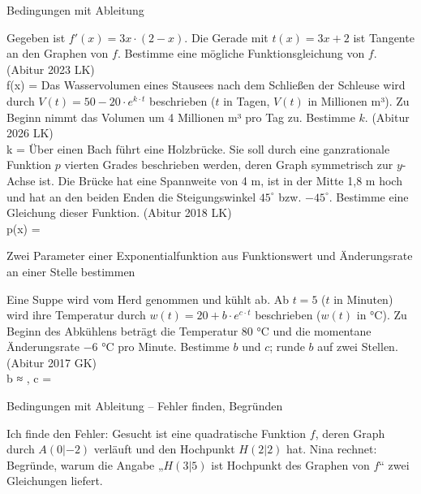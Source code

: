 \begin{aufgabe}{Bedingungen mit Ableitung}
\begin{teile}
\teil Gegeben ist $f'(x) = 3x \cdot (2 - x)$. Die Gerade mit $t(x) = 3x + 2$ ist Tangente an den Graphen von $f$. Bestimme eine mögliche Funktionsgleichung von $f$. \hfill (Abitur 2023 LK) \\ f(x) = \leerfeld
\teil Das Wasservolumen eines Stausees nach dem Schließen der Schleuse wird durch $V(t) = 50 - 20 \cdot e^{k \cdot t}$ beschrieben ($t$ in Tagen, $V(t)$ in Millionen m³). Zu Beginn nimmt das Volumen um 4 Millionen m³ pro Tag zu. Bestimme $k$. \hfill (Abitur 2026 LK) \\ k = \leerfeld
\teil Über einen Bach führt eine Holzbrücke. Sie soll durch eine ganzrationale Funktion $p$ vierten Grades beschrieben werden, deren Graph symmetrisch zur $y$-Achse ist. Die Brücke hat eine Spannweite von 4 m, ist in der Mitte 1,8 m hoch und hat an den beiden Enden die Steigungswinkel $45^\circ$ bzw. $-45^\circ$. Bestimme eine Gleichung dieser Funktion. \hfill (Abitur 2018 LK) \\ p(x) = \leerfeld
\end{teile}
\end{aufgabe}

\begin{aufgabe}{Zwei Parameter einer Exponentialfunktion aus Funktionswert und Änderungsrate an einer Stelle bestimmen}
\begin{teile}
\teil Eine Suppe wird vom Herd genommen und kühlt ab. Ab $t = 5$ ($t$ in Minuten) wird ihre Temperatur durch $w(t) = 20 + b \cdot e^{c \cdot t}$ beschrieben ($w(t)$ in °C). Zu Beginn des Abkühlens beträgt die Temperatur 80 °C und die momentane Änderungsrate $-6$ °C pro Minute. Bestimme $b$ und $c$; runde $b$ auf zwei Stellen. \hfill (Abitur 2017 GK) \\ b ≈ \leerfeld , c = \leerfeld
\end{teile}
\end{aufgabe}

\begin{aufgabe}{Bedingungen mit Ableitung – Fehler finden, Begründen}
\begin{teile}
\teil Ich finde den Fehler: Gesucht ist eine quadratische Funktion $f$, deren Graph durch $A(0|-2)$ verläuft und den Hochpunkt $H(2|2)$ hat. Nina rechnet: 
\teil Begründe, warum die Angabe „$H(3|5)$ ist Hochpunkt des Graphen von $f$“ zwei Gleichungen liefert.
\end{teile}
\end{aufgabe}

